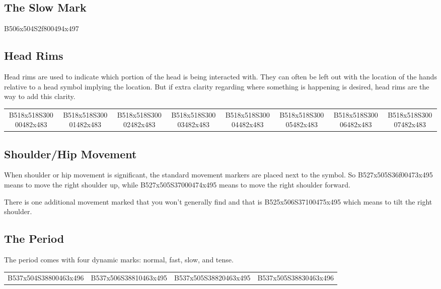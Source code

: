 \documentclass{article}
\begin{document}
\subsection{The Slow Mark}

\begin{center}
B506x504S2f800494x497
\end{center}

\subsection{Head Rims}

Head rims are used to indicate which portion of the head is being interacted with.
They can often be left out with the location of the hands relative to a head symbol implying the location.
But if extra clarity regarding where something is happening is desired, head rims are the way to add this clarity.

\begin{center}
\begin{tabular}{*{8}{c}}
B518x518S30000482x483&
B518x518S30001482x483&
B518x518S30002482x483&
B518x518S30003482x483&
B518x518S30004482x483&
B518x518S30005482x483&
B518x518S30006482x483&
B518x518S30007482x483\\
\end{tabular}
\end{center}

\subsection{Shoulder/Hip Movement}

When shoulder or hip movement is significant, the standard movement markers are placed next to the symbol.
So B527x505S36f00473x495 means to move the right shoulder up, while B527x505S37000474x495 means to move the right shoulder forward.

There is one additional movement marked that you won't generally find and that is B525x506S37100475x495 which means to tilt the right shoulder.

\subsection{The Period}

The period comes with four dynamic marks: normal, fast, slow, and tense.

\begin{center}
\begin{tabular}{*{4}{c}}
B537x504S38800463x496&
B537x506S38810463x495&
B537x505S38820463x495&
B537x505S38830463x496\\
\end{tabular}
\end{center}
\end{document}
